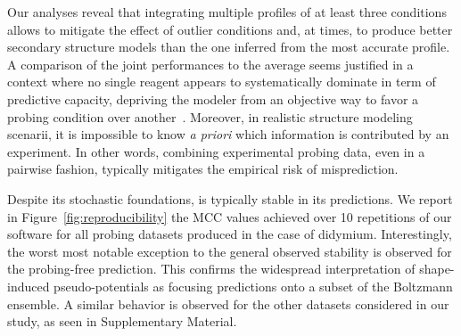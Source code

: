 \documentclass[a4,center,fleqn]{NAR}
\newcommand{\Software}[1]{\text{\ttfamily\bfseries #1}}
\newcommand{\OurTool}{\Software{IPANEMAP}\xspace}
\begin{document}
Our analyses reveal that integrating multiple profiles of at least three conditions allows to mitigate the effect of outlier conditions and, at times, to produce better secondary structure models than the one inferred from the most accurate profile. A comparison of the joint performances to the average seems justified in a context where no single reagent appears to systematically dominate in term of predictive capacity, depriving the modeler from an objective way to favor a probing condition over another~\cite{Yu2018}. Moreover, in realistic structure modeling scenarii, it is impossible to know \emph{a priori} which information is contributed by an experiment. In other words, combining experimental probing data, even in a pairwise fashion, typically mitigates the empirical risk of misprediction. 

Despite its stochastic foundations, \OurTool{} is typically stable in its predictions. We report in Figure~\ref{fig:reproducibility} the MCC values achieved over  10 repetitions of our software for all probing datasets produced in the case of didymium. 
Interestingly, the worst most notable exception to the general observed stability is observed for the probing-free prediction. This confirms the widespread interpretation of shape-induced pseudo-potentials as focusing predictions onto a subset of the Boltzmann ensemble. A similar behavior is observed for the other datasets considered in our study, as seen in Supplementary Material. %
\end{document}
